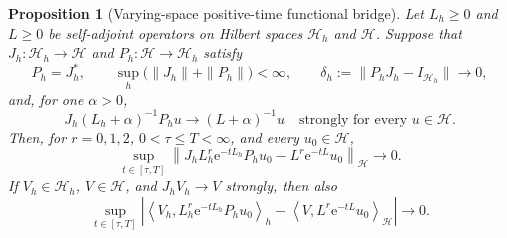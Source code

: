 \documentclass[aps,physrev,onecolumn,amsmath,amssymb,longbibliography]{revtex4-2}
\newcommand{\e}{\mathrm e}
\newtheorem{proposition}[theorem]{Proposition}
\begin{document}
\begin{proposition}[Varying-space positive-time functional bridge]
\label{prop:varying-space-functional-bridge}
Let \(L_h\ge0\) and \(L\ge0\) be self-adjoint operators on Hilbert spaces
\(\mathcal H_h\) and \(\mathcal H\).  Suppose that
\(J_h:\mathcal H_h\to\mathcal H\) and
\(P_h:\mathcal H\to\mathcal H_h\) satisfy
\begin{equation}
 P_h=J_h^*,\qquad
 \sup_h\bigl(\|J_h\|+\|P_h\|\bigr)<\infty,
 \qquad
 \delta_h:=\|P_hJ_h-I_{\mathcal H_h}\|\longrightarrow0,
 \label{eq:varying-map-hypotheses}
\end{equation}
and, for one \(\alpha>0\),
\begin{equation}
 J_h(L_h+\alpha)^{-1}P_hu
 \longrightarrow (L+\alpha)^{-1}u
 \quad\text{strongly for every }u\in\mathcal H.
 \label{eq:varying-resolvent-hypothesis}
\end{equation}
Then, for \(r=0,1,2\), \(0<\tau\le T<\infty\), and every
\(u_0\in\mathcal H\),
\begin{equation}
 \sup_{t\in[\tau,T]}
 \left\|J_hL_h^r\e^{-tL_h}P_hu_0
       -L^r\e^{-tL}u_0\right\|_{\mathcal H}
 \longrightarrow0.
 \label{eq:varying-positive-time-state}
\end{equation}
If \(V_h\in\mathcal H_h\), \(V\in\mathcal H\), and
\(J_hV_h\to V\) strongly, then also
\begin{equation}
 \sup_{t\in[\tau,T]}
 \left|
 \left\langle V_h,L_h^r\e^{-tL_h}P_hu_0\right\rangle_h
 -\left\langle V,L^r\e^{-tL}u_0\right\rangle_{\mathcal H}
 \right|\longrightarrow0.
 \label{eq:varying-positive-time-pairing}
\end{equation}
\end{proposition}
\end{document}

